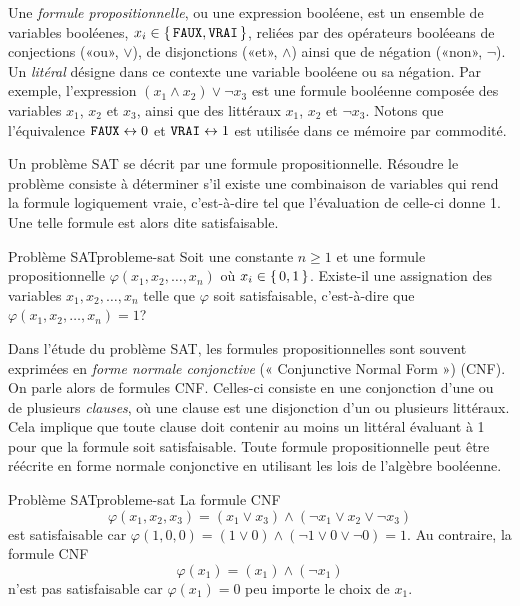 Une \textit{formule propositionnelle}, ou une expression booléene, est un ensemble de variables booléenes, $x_{i} \in \set{\textsc{\texttt{FAUX}}, \textsc{\texttt{VRAI}}}$, reliées par des opérateurs booléeans de conjections («ou», $\lor$), de disjonctions («et», $\land$) ainsi que de négation («non», $\neg$).  Un \textit{litéral} désigne dans ce contexte une variable booléene ou sa négation. Par exemple, l'expression $(x_{1} \land x_{2}) \lor \neg x_{3}$ est une formule booléenne composée des variables $x_{1}$, $x_{2}$ et $x_{3}$, ainsi que des littéraux $x_{1}$, $x_{2}$ et $\neg x_{3}$. Notons que l'équivalence $\textsc{\texttt{FAUX}} \leftrightarrow 0$ et $\textsc{\texttt{VRAI}} \leftrightarrow 1$ est utilisée dans ce mémoire par commodité.

Un problème SAT se décrit par une formule propositionnelle. Résoudre le problème consiste à déterminer s'il existe une combinaison de variables qui rend la formule logiquement vraie, c'est-à-dire tel que l'évaluation de celle-ci donne 1. Une telle formule est alors dite satisfaisable.

\begin{maindefinition}{Problème SAT}{probleme-sat}
    Soit une constante $n \geq 1$ et une formule propositionnelle $\varphi(x_{1}, x_{2}, \dots, x_{n})$ où $x_{i} \in \set{ 0, 1 }$.  Existe-il une assignation des variables $x_{1}, x_{2}, \dots, x_{n}$ telle que $\varphi$ soit satisfaisable, c'est-à-dire que $\varphi(x_{1}, x_{2}, \dots, x_{n})=1$?
\end{maindefinition}

Dans l'étude du problème SAT, les formules propositionnelles sont souvent exprimées en \textit{forme normale conjonctive} (« Conjunctive Normal Form ») (CNF). On parle alors de formules CNF. Celles-ci consiste en une conjonction d'une ou de plusieurs \textit{clauses}, où une clause est une disjonction d'un ou plusieurs littéraux. Cela implique que toute clause doit contenir au moins un littéral évaluant à 1 pour que la formule soit satisfaisable. Toute formule propositionnelle peut être réécrite en forme normale conjonctive en utilisant les lois de l'algèbre booléenne.

\begin{example}{Problème SAT}{probleme-sat}
    La formule CNF
    \begin{equation*}
        \varphi(x_{1}, x_{2}, x_{3}) = (x_{1} \lor x_{3}) \land (\neg x_{1} \lor x_{2} \lor \neg x_{3}) 
    \end{equation*}
    est satisfaisable car $\varphi(1,0,0) = (1 \lor 0) \land (\neg 1 \lor 0 \lor \neg 0) = 1$. Au contraire, la formule CNF
    \begin{equation*}
        \varphi(x_{1})= (x_{1}) \land (\neg x_{1})
    \end{equation*}
    n'est pas satisfaisable car $\varphi (x_{1}) = 0$ peu importe le choix de $x_{1}$.
\end{example}

